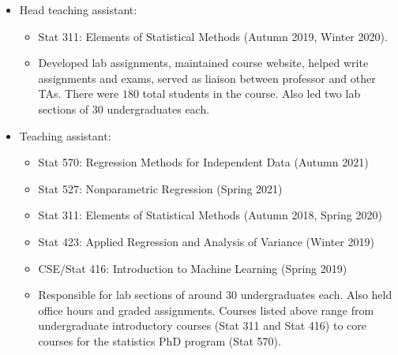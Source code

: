 \documentclass[margin, 10pt]{res}
\begin{document}
\begin{resume}
\begin{itemize}
\begin{itemize}
\end{itemize} 
\item Head teaching assistant:
\begin{itemize}
\item Stat 311: Elements of Statistical Methods (Autumn 2019, Winter 2020).  
\item Developed lab assignments, maintained course website, helped write assignments and exams, served as liaison between professor and other TAs. There were $180$ total students in the course. Also led two lab sections of 30 undergraduates each. 
\end{itemize} 
\item Teaching assistant: 
\begin{itemize}
\item Stat 570: Regression Methods for Independent Data (Autumn 2021)
\item Stat 527: Nonparametric Regression (Spring 2021)
\item Stat 311: Elements of Statistical Methods (Autumn 2018, Spring 2020)
\item Stat 423:  Applied Regression and Analysis of Variance (Winter 2019)
\item CSE/Stat 416: Introduction to Machine Learning (Spring 2019) 
\item Responsible for lab sections of around 30 undergraduates each. Also held office hours and graded assignments. Courses listed above range from undergraduate introductory courses (Stat 311 and Stat 416) to core courses for the statistics PhD program (Stat 570). 
\end{itemize}
\end{itemize}




\end{resume}
\end{document}
